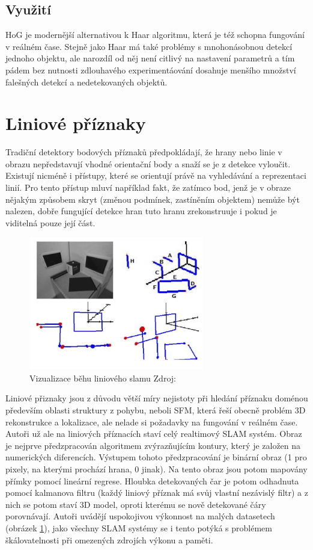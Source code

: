 	\subsection{Využití}
	
	HoG je modernější alternativou k Haar algoritmu, která je též schopna fungování v reálném čase. Stejně jako Haar má také problémy s mnohonásobnou detekcí jednoho objektu, ale narozdíl od něj není citlivý na nastavení parametrů a tím pádem bez nutnosti zdlouhavého experimentáování dosahuje menšího množství falešných detekcí a nedetekovaných objektů.


\section{Liniové příznaky}
\label{sec:line}
	Tradiční detektory bodových příznaků předpokládají, že hrany nebo linie v obrazu nepředstavují vhodné orientační body a snaží se je z detekce vyloučit. Existují nicméně i přístupy, které se orientují právě na vyhledávání a reprezentaci linií. Pro tento přístup mluví například fakt, že zatímco bod, jenž je v obraze nějakým způsobem skryt (změnou podmínek, zastíněním objektem) nemůže být nalezen, dobře fungující detekce hran tuto hranu zrekonstruuje i pokud je viditelná pouze její část.
	
	\begin{figure}[!ht] 
		\centering
		\includegraphics[width=3in]{img/line_slam.png}
		\caption{Vizualizace běhu liniového slamu 
			Zdroj: \cite{gee2006real}
		}	
		\label{line_slam}
	\end{figure} 
	
	Liniové přiznaky jsou z důvodu větší míry nejistoty při hledání příznaku doménou především oblasti struktury z pohybu, neboli SFM, která řeší obecně problém 3D rekonstrukce a lokalizace, ale nelade si požadavky na fungování v reálném čase. Autoři \cite{gee2006real} už ale na liniových příznacích staví celý realtimový SLAM systém. Obraz je nejprve předzpracován algoritmem zvýrazňujícím kontury, který je založen na numerických diferencích. Výstupem tohoto předzpracování je binární obraz (1 pro pixely, na kterými prochází hrana, 0 jinak). Na tento obraz jsou potom mapovány přímky pomocí lineární regrese. Hloubka detekovaných čar je potom odhadnuta pomocí kalmanova filtru (každý liniový příznak má svůj vlastní nezávislý filtr) a z nich se potom staví 3D model, oproti kterému se nově detekované čáry porovnávají. Autoři uvádějí uspokojivou výkonnost na malých datasetech (obrázek \ref{line_slam}), jako všechny SLAM systémy se i tento potýká s problémem škálovatelnosti při omezených zdrojích výkonu a paměti.
	
